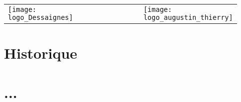 \documentclass[12pt,oneside]{report}
\newcommand{\classe}{\tnsi}
\newcommand{\nomchapitre}{...}
\begin{document}
\begin{module}[colback=white]{\classe}
\vspace*{1em}
\begin{tabular}{m{0.15\linewidth}M{0.63\linewidth}R{0.15\linewidth}}
\texttt{[image: logo\_Dessaignes]}
&
\textcolor{blue}{\LARGE \bsc{\nomchapitre}}
&
\texttt{[image: logo\_augustin\_thierry]}
\end{tabular}
\vspace*{0.2em}
\end{module}

\begin{spacing}{1.2}


\section{Historique}




\section{...}






\end{spacing}
\end{document}

